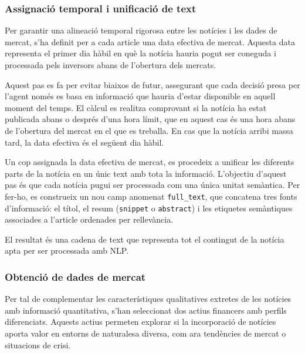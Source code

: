 \documentclass[12pt,a4paper,twoside]{book}
\begin{document}
\subsubsection*{Assignació temporal i unificació de text}

Per garantir una alineació temporal rigorosa entre les notícies i les dades de mercat, s'ha definit per a cada article una data efectiva de mercat. Aquesta data representa el primer dia hàbil en què la notícia hauria pogut ser coneguda i processada pels inversors abans de l'obertura dels mercats.

Aquest pas es fa per evitar biaixos de futur, assegurant que cada decisió presa per l'agent només es basa en informació que hauria d'estar disponible en aquell moment del temps. El càlcul es realitza comprovant si la notícia ha estat publicada abans o després d'una hora límit, que en aquest cas és una hora abans de l'obertura del mercat en el que es treballa. En cas que la notícia arribi massa tard, la data efectiva és el següent dia hàbil.

Un cop assignada la data efectiva de mercat, es procedeix a unificar les diferents parts de la notícia en un únic text amb tota la informació. L'objectiu d'aquest pas és que cada notícia pugui ser processada com una única unitat semàntica. Per fer-ho, es construeix un nou camp anomenat \texttt{full\_text}, que concatena tres fonts d'informació: el títol, el resum (\texttt{snippet} o \texttt{abstract}) i les etiquetes semàntiques associades a l'article ordenades per rellevància.

El resultat és una cadena de text que representa tot el contingut de la notícia apta per ser processada amb NLP.


\subsubsection{Obtenció de dades de mercat}

Per tal de complementar les característiques qualitatives extretes de les notícies amb informació quantitativa, s'han seleccionat dos actius financers amb perfils diferenciats. Aquests actius permeten explorar si la incorporació de notícies aporta valor en entorns de naturalesa diversa, com ara tendències de mercat o situacions de crisi.
\end{document}
